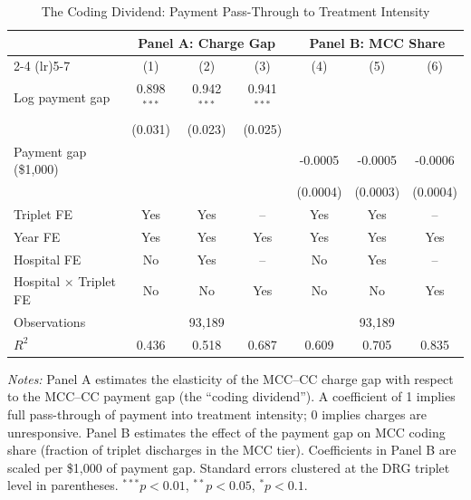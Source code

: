 \begin{table}[htbp]
\centering
\caption{The Coding Dividend: Payment Pass-Through to Treatment Intensity}
\label{tab:main}
\begin{tabular}{lcccccc}
\hline\hline
 & \multicolumn{3}{c}{Panel A: Charge Gap} & \multicolumn{3}{c}{Panel B: MCC Share} \\
\cmidrule(lr){2-4} \cmidrule(lr){5-7}
 & (1) & (2) & (3) & (4) & (5) & (6) \\
\hline
Log payment gap & 0.898$^{***}$ & 0.942$^{***}$ & 0.941$^{***}$ & & & \\
 & (0.031) & (0.023) & (0.025) & & & \\
Payment gap (\$1,000) & & & & -0.0005 & -0.0005 & -0.0006 \\
 & & & & (0.0004) & (0.0003) & (0.0004) \\
\hline
Triplet FE & Yes & Yes & -- & Yes & Yes & -- \\
Year FE & Yes & Yes & Yes & Yes & Yes & Yes \\
Hospital FE & No & Yes & -- & No & Yes & -- \\
Hospital $\times$ Triplet FE & No & No & Yes & No & No & Yes \\
Observations & \multicolumn{3}{c}{93,189} & \multicolumn{3}{c}{93,189} \\
$R^2$ & 0.436 & 0.518 & 0.687 & 0.609 & 0.705 & 0.835 \\
\hline\hline
\end{tabular}
\begin{tablenotes}[flushleft]\small
\item \textit{Notes:} Panel A estimates the elasticity of the MCC--CC charge gap with respect to the MCC--CC payment gap (the ``coding dividend''). A coefficient of 1 implies full pass-through of payment into treatment intensity; 0 implies charges are unresponsive. Panel B estimates the effect of the payment gap on MCC coding share (fraction of triplet discharges in the MCC tier). Coefficients in Panel B are scaled per \$1,000 of payment gap. Standard errors clustered at the DRG triplet level in parentheses. $^{***}p<0.01$, $^{**}p<0.05$, $^{*}p<0.1$.
\end{tablenotes}
\end{table}

